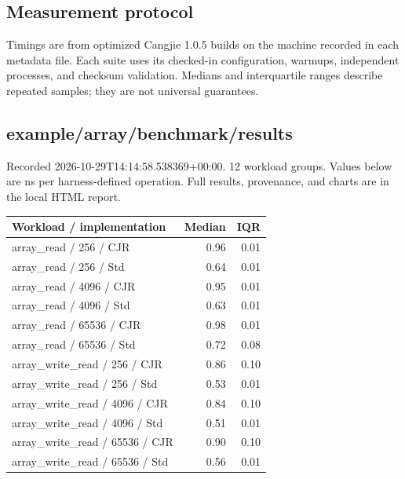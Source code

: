 \subsection{Measurement protocol}
Timings are from optimized Cangjie 1.0.5 builds on the machine recorded in each metadata file. Each suite uses its checked-in configuration, warmups, independent processes, and checksum validation. Medians and interquartile ranges describe repeated samples; they are not universal guarantees.\par
\subsection{example/array/benchmark/results}
Recorded 2026-10-29T14:14:58.538369+00:00. 12 workload groups. Values below are ns per harness-defined operation. Full results, provenance, and charts are in the local HTML report.
\begin{longtable}{p{}rr}Workload / implementation & Median & IQR \\ \hline
array\_read / 256 / CJR & 0.96 & 0.01 \\
array\_read / 256 / Std & 0.64 & 0.01 \\
array\_read / 4096 / CJR & 0.95 & 0.01 \\
array\_read / 4096 / Std & 0.63 & 0.01 \\
array\_read / 65536 / CJR & 0.98 & 0.01 \\
array\_read / 65536 / Std & 0.72 & 0.08 \\
array\_write\_read / 256 / CJR & 0.86 & 0.10 \\
array\_write\_read / 256 / Std & 0.53 & 0.01 \\
array\_write\_read / 4096 / CJR & 0.84 & 0.10 \\
array\_write\_read / 4096 / Std & 0.51 & 0.01 \\
array\_write\_read / 65536 / CJR & 0.90 & 0.10 \\
array\_write\_read / 65536 / Std & 0.56 & 0.01 \\
\end{longtable}
